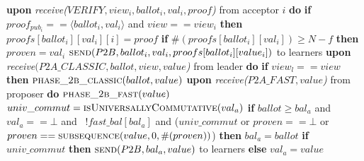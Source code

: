 \documentclass[algorithms,article,accept,moreauthors,pdftex,10pt,a4paper]{Definitions/mdpi}
\begin{document}
\begin{algorithm}[H]
\begin{algorithmic}[1]
\State
\State \textbf{upon} \textit{receive($VERIFY,view_i, ballot_i,val_i,proof$)} from acceptor $i$ \textbf{do}
\State \hspace{\algorithmicindent} \textbf{if} $proof_{pub_i} == \langle ballot_i, val_i \rangle$ and $view == view_i$ \textbf{then}
\State \hspace{\algorithmicindent}\hspace{\algorithmicindent} $proofs[ballot_i][val_i][i] = proof$
\State \hspace{\algorithmicindent}\hspace{\algorithmicindent} \textbf{if} $\#(proofs[ballot_i][val_i]) \geq N-f$ \textbf{then}
\State \hspace{\algorithmicindent}\hspace{\algorithmicindent}\hspace{\algorithmicindent} $proven = val_i$
\State \hspace{\algorithmicindent}\hspace{\algorithmicindent}\hspace{\algorithmicindent} $\Call{send}{P2B, ballot_i, val_i, proofs[ballot_i][value_i]}$ to learners
\State
\State \textbf{upon} \textit{receive$(P2A\_CLASSIC, ballot, view, value$)} from leader \textbf{do}
\State \hspace{\algorithmicindent} \textbf{if} $view_l == view$ \textbf{then}
\State \hspace{\algorithmicindent}\hspace{\algorithmicindent} $\Call{phase\_2b\_classic}{ballot, value}$
\State 
\State \textbf{upon} \textit{receive($P2A\_FAST, value$)} from proposer \textbf{do}
\State \hspace{\algorithmicindent} $\Call{phase\_2b\_fast}{value}$
\State
{}
\State $univ\_commut = \Call{isUniversallyCommutative}{val_a}$
\State \textbf{if} $ballot \geq bal_a$ and $val_a == \bot$ and \ $!fast\_bal[bal_a]$ and ($univ\_commut$ or $proven == \bot$ or $proven == \Call{subsequence}{value, 0, \#(proven)}$) \textbf{then}
\State \hspace{\algorithmicindent} $bal_a = ballot$
\State \hspace{\algorithmicindent} \textbf{if} $univ\_commut$ \textbf{then}
\State \hspace{\algorithmicindent}\hspace{\algorithmicindent} $\Call{send}{P2B,bal_a, value}$ to learners
\State \hspace{\algorithmicindent} \textbf{else} 
\State \hspace{\algorithmicindent}\hspace{\algorithmicindent} $val_a = value$

\end{algorithmic}
\end{algorithm}
\end{document}
